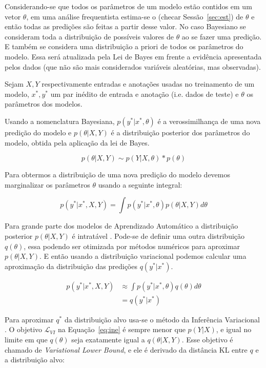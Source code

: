 Considerando-se que todos os parâmetros de um modelo estão contidos em um vetor
$\theta$, em uma análise frequentista estima-se o  (checar Sessão~\ref{sec:est}) de $\theta$ e então todas as
predições são feitas a partir desse valor. No caso Bayesiano se consideram toda
a distribuição de possíveis valores de $\theta$ ao se fazer uma predição. E
também se considera uma distribuição a priori de todos os parâmetros do modelo.
Essa será atualizada pela Lei de Bayes em frente a evidência apresentada pelos
dados (que não são mais considerados variáveis aleatórias, mas observadas).

Sejam $X,Y$ respectivamente entradas e anotações usadas no treinamento de um modelo,
$x^*,y^*$ um par inédito de entrada e anotação (i.e. dados de teste) e
$\theta$ os parâmetros dos modelos.

Usando a nomenclatura Bayesiana, $p(y^* | x^*,\theta)$ é a verossimilhança de
uma nova predição do modelo e $p(\theta | X,Y)$ é a distribuição posterior dos
parâmetros do modelo, obtida pela aplicação da lei de Bayes.

\[
  p(\theta | X,Y) \sim p(Y | X,\theta) * p(\theta)
\]


Para obtermos a distribuição de uma nova predição do modelo devemos marginalizar os parâmetros $\theta$ usando a seguinte integral:

\begin{equation}
  \label{eq:int}
  p(y^* | x^* , X,Y) = \int  p(y^* | x^*,\theta) p(\theta | X,Y)  d\theta 
\end{equation}

Para grande parte dos modelos de Aprendizado Automático a distribuição posterior
$p(\theta | X,Y)$ é intratável \citep{ubertime}. Pode-se de definir uma outra
distribuição $q(\theta)$, essa podendo ser otimizada por métodos numéricos para
aproximar $p(\theta | X,Y)$. E então usando a distribuição variacional podemos
calcular uma aproximação da distribuição das predições $q(y^*|x^*)$. 

\begin{align*}
  \label {eq:pq}
    p(y^* | x^* , X,Y) &\approx \int  p(y^* | x^*,\theta) q(\theta)d\theta \\
                       &= q(y^* | x^*)
\end{align*}

 Para aproximar $q^*$ da distribuição alvo usa-se o método da Inferência
Variacional \citep{bayesml}. O objetivo $\mathcal{L}_{VI}$ na
Equação~\ref{eq:ine} é sempre menor que $p(Y|X)$, e igual no limite em que
$q(\theta)$ seja exatamente igual a $q(\theta | X,Y)$. Esse objetivo é chamado de
\textit{Variational Lower Bound}, e ele é derivado da distância KL entre $q$ e
a distribuição alvo:

